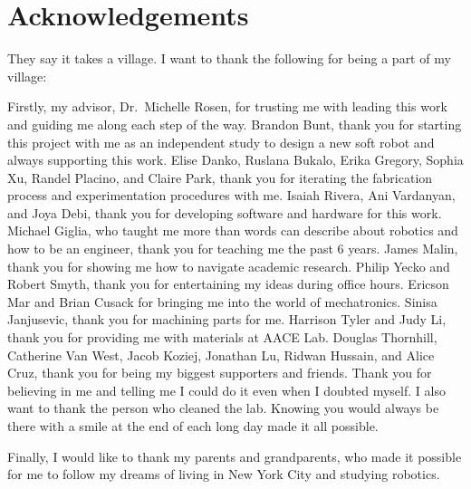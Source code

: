\section*{Acknowledgements}

They say it takes a village. I want to thank the following for being a part of my village:

Firstly, my advisor, Dr.~Michelle Rosen, for trusting me with leading this work and guiding me along each step of the way. Brandon Bunt, thank you for starting this project with me as an independent study to design a new soft robot and always supporting this work. Elise Danko, Ruslana Bukalo, Erika Gregory, Sophia Xu, Randel Placino, and Claire Park, thank you for iterating the fabrication process and experimentation procedures with me. Isaiah Rivera, Ani Vardanyan, and Joya Debi, thank you for developing software and hardware for this work. Michael Giglia, who taught me more than words can describe about robotics and how to be an engineer, thank you for teaching me the past 6 years. James Malin, thank you for showing me how to navigate academic research. Philip Yecko and Robert Smyth, thank you for entertaining my ideas during office hours. Ericson Mar and Brian Cusack for bringing me into the world of mechatronics. Sinisa Janjusevic, thank you for machining parts for me. Harrison Tyler and Judy Li, thank you for providing me with materials at AACE Lab. Douglas Thornhill, Catherine Van West, Jacob Koziej, Jonathan Lu, Ridwan Hussain, and Alice Cruz, thank you for being my biggest supporters and friends. Thank you for believing in me and telling me I could do it even when I doubted myself. I also want to thank the person who cleaned the lab. Knowing you would always be there with a smile at the end of each long day made it all possible. 

Finally, I would like to thank my parents and grandparents, who made it possible for me to follow my dreams of living in New York City and studying robotics. 